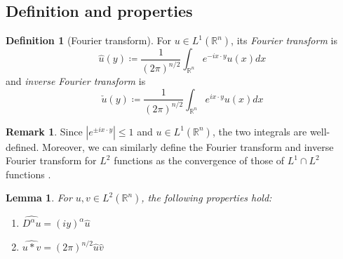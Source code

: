 \documentclass[openany, amssymb, psamsfonts]{amsart}
\newtheorem{lem}{Lemma}[section]
\theoremstyle{definition}
\newtheorem{defn}{Definition}[section]
\newtheorem{rem}{Remark}[section]
\numberwithin{equation}{section}
\newcommand{\bbr}{\mathbb{R}}
\begin{document}
\subsection{Definition and properties}
\begin{defn} [Fourier transform]
    For $u \in L^1(\bbr^n)$, its \textit{Fourier transform} is \begin{equation}
        \hat{u}(y) \coloneqq \frac{1}{(2\pi)^{n/2}} \int_{\bbr^n} e^{-ix \cdot y} u(x) dx
    \end{equation}
    and \textit{inverse Fourier transform} is
    \begin{equation}
    \check{u} (y) \coloneqq \frac{1}{(2\pi)^{n/2}} \int_{\bbr^n} e^{ix \cdot y} u(x) dx
    \end{equation}
\end{defn}

\begin{rem}
Since $|e^{\pm ix \cdot y}| \leq 1$ and $u \in L^1(\bbr^n)$, the two integrals are well-defined. Moreover, we can similarly define the Fourier transform and inverse Fourier transform for $L^2$ functions as the convergence of those of $L^1 \cap L^2$ functions \cite{Evans}.
\end{rem}

\begin{lem}
For $u, v \in L^2(\bbr^n)$, the following properties hold:
\begin{enumerate}
    \item $\widehat{D^\alpha u} = (iy)^\alpha \hat{u}$
    \item $\widehat{u * v} = (2 \pi)^{n/2} \hat{u} \hat{v}$
\end{enumerate}
\end{lem}
\end{document}
